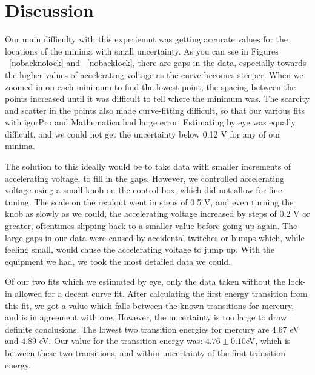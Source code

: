 \documentclass[prb,preprint]{revtex4-1}
\begin{document}
\section{Discussion}
Our main difficulty with this experiemnt was getting accurate values for the locations of the minima with small uncertainty.  As you can see in Figures ~\ref{nobacknolock} and ~\ref{nobacklock}, there are gaps in the data, especially towards the higher values of accelerating voltage as the curve becomes steeper.  When we zoomed in on each minimum to find the lowest point, the spacing between the points increased until it was difficult to tell where the minimum was.  The scarcity and scatter in the points also made curve-fitting difficult, so that our various fits with igorPro and Mathematica had large error. Estimating by eye was equally difficult, and we could not get the uncertainty below 0.12 V for any of our minima.  

The solution to this ideally would be to take data with smaller increments of accelerating voltage, to fill in the gaps. However, we controlled accelerating voltage using a small knob on the control box, which did not allow for fine tuning. The scale on the readout went in steps of 0.5 V, and even turning the knob as slowly as we could, the accelerating voltage increased by steps of 0.2 V or greater, oftentimes slipping back to a smaller value before going up again. The large gaps in our data were caused by accidental twitches or bumps which, while feeling small, would cause the accelerating voltage to jump up. With the equipment we had,  we took the most detailed data we could. 

Of our two fits which we estimated by eye, only the data taken without the lock-in allowed for a decent curve fit.  After calculating the first energy transition from this fit, we got a value which falls between the known transitions for mercury, and is in agreement with one.  However, the uncertainty is too large to draw definite conclusions.  The lowest two transition energies for mercury are 4.67 eV and 4.89 eV.  Our value for the transition energy was: $4.76 \pm 0.10$eV, which is between these two transitions, and within uncertainty of the first transition energy. 
\end{document}
